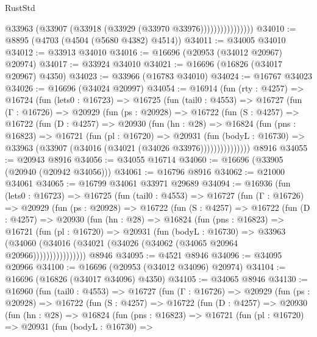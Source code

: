 \begin{lexlean}{RustStd}
\begin{coremodule}
                          @33963 (@33907 (@33918 (@33929 (@33970 @33976))))))))))))))))
@34010 := @8895 (@4703 (@4504 (@5680 @4382) @4514))
@34011 := @34005 @34010
@34012 := @33913 @34010
@34016 := @16696 (@20953 (@34012 @20967) @20974)
@34017 := @33924 @34010
@34021 := @16696 (@16826 (@34017 @20967) @4350)
@34023 := @33966 (@16783 @34010)
@34024 := @16767 @34023
@34026 := @16696 (@34024 @20997)
@34054 := @16914
    (fun (rty : @4257) =>
    @16724
      (fun (lets0 : @16723) =>
      @16725
        (fun (tail0 : @4553) =>
        @16727
          (fun (Γ : @16726) =>
          @20929
            (fun (ps : @20928) =>
            @16722
              (fun (S : @4257) =>
              @16722
                (fun (D : @4257) =>
                @20930
                  (fun (hn : @28) =>
                  @16824
                    (fun (pns : @16823) =>
                    @16721
                      (fun (pl : @16720) =>
                      @20931
                        (fun (bodyL : @16730) =>
                        @33963 (@33907 (@34016 (@34021 (@34026 @33976)))))))))))))))
    @8916
@34055 := @20943 @8916
@34056 := @34055 @16714
@34060 := @16696 (@33905 (@20940 (@20942 @34056)))
@34061 := @16796 @8916
@34062 := @21000 @34061
@34065 := @16799 @34061 @33971 @29689
@34094 := @16936
    (fun (lets0 : @16723) =>
    @16725
      (fun (tail0 : @4553) =>
      @16727
        (fun (Γ : @16726) =>
        @20929
          (fun (ps : @20928) =>
          @16722
            (fun (S : @4257) =>
            @16722
              (fun (D : @4257) =>
              @20930
                (fun (hn : @28) =>
                @16824
                  (fun (pns : @16823) =>
                  @16721
                    (fun (pl : @16720) =>
                    @20931
                      (fun (bodyL : @16730) =>
                      @33963
                        (@34060
                          (@34016 (@34021 (@34026 (@34062 (@34065 @20964 @20966))))))))))))))))
    @8946
@34095 := @4521 @8946
@34096 := @34095 @20966
@34100 := @16696 (@20953 (@34012 @34096) @20974)
@34104 := @16696 (@16826 (@34017 @34096) @4350)
@34105 := @34065 @8946
@34130 := @16960
    (fun (tail0 : @4553) =>
    @16727
      (fun (Γ : @16726) =>
      @20929
        (fun (ps : @20928) =>
        @16722
          (fun (S : @4257) =>
          @16722
            (fun (D : @4257) =>
            @20930
              (fun (hn : @28) =>
              @16824
                (fun (pns : @16823) =>
                @16721
                  (fun (pl : @16720) =>
                  @20931
                    (fun (bodyL : @16730) =>

\end{coremodule}
\end{lexlean}
